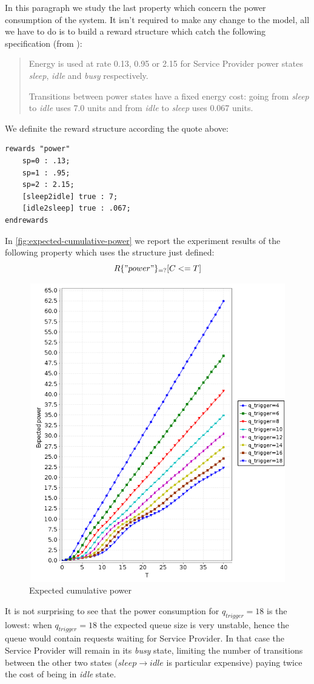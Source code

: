 In this paragraph we study the last property which concern the power
consumption of the system. It isn't required to make any change to the
model, all we have to do is to build a reward structure which catch
the following specification (from \cite{QWP99}):
\begin{quote}
  Energy is used at rate 0.13, 0.95 or 2.15 for Service Provider power
  states \emph{sleep}, \emph{idle} and \emph{busy} respectively.

  Transitions between power states have a fixed energy cost: going
  from \emph{sleep} to \emph{idle} uses 7.0 units and from \emph{idle}
  to \emph{sleep} uses 0.067 units.
\end{quote}
We definite the reward structure according the quote above:
\begin{verbatim}
rewards "power"
	sp=0 : .13;
	sp=1 : .95;
	sp=2 : 2.15;
	[sleep2idle] true : 7;
	[idle2sleep] true : .067;
endrewards
\end{verbatim}

In \autoref{fig:expected-cumulative-power} we report the experiment
results of the following property which uses the structure just
defined:
\begin{displaymath}
  R\{"power"\}_{=?} [ C<=T ]
\end{displaymath}
\begin{figure}[htb]
  \centering
  \includegraphics[width=13cm,
  height=13cm]{quantitative-project/expected-power.png}
  \caption{Expected cumulative power}
  \label{fig:expected-cumulative-power}
\end{figure}
It is not surprising to see that the power consumption for
$q_{trigger}=18$ is the lowest: when $q_{trigger} = 18$ the expected
queue size is very unstable, hence the queue would contain requests
waiting for Service Provider. In that case the Service Provider will
remain in its \emph{busy} state, limiting the number of transitions
between the other two states ($sleep \rightarrow idle$ is particular
expensive) paying twice the cost of being in \emph{idle} state.

